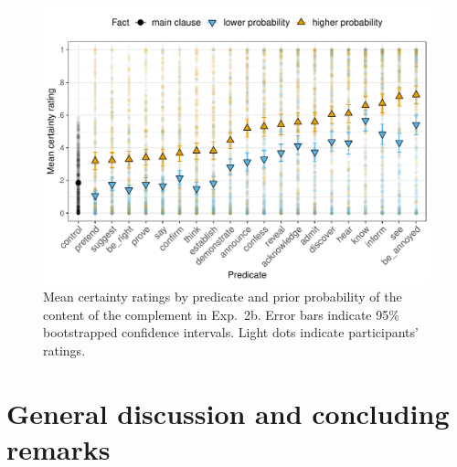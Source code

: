 \documentclass[OpenMind]{stjour}
\begin{document}
\begin{figure}[h!]
\centering

\includegraphics[width=\textwidth]{../../results/3-projectivity/graphs/means-projectivity-by-predicate-and-prior}

\caption{Mean certainty ratings by predicate and prior probability of the content of the complement in Exp.~2b. Error bars indicate 95\% bootstrapped confidence intervals. Light dots indicate participants' ratings.} 
\label{f-projection-mean-2b}
\end{figure}

\section{General discussion and concluding remarks}
\label{s4}
\end{document}
